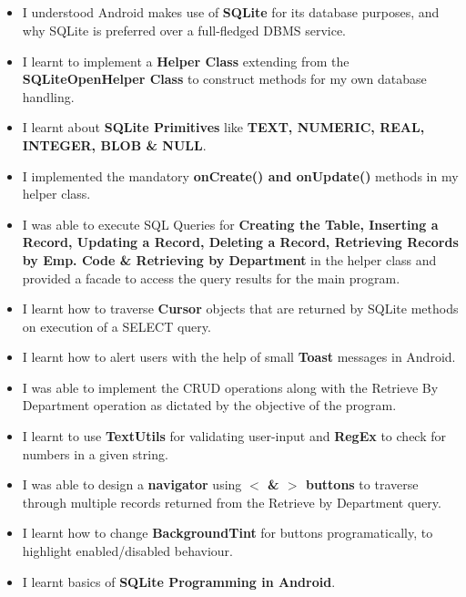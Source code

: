 \documentclass[12pt, a4]{article}
\begin{document}
\subsection*{}
\begin{itemize}
\item I understood Android makes use of \textbf{SQLite} for its database purposes, and why SQLite is preferred over a full-fledged DBMS service.
\item I learnt to implement a \textbf{Helper Class} extending from the \textbf{SQLiteOpenHelper Class} to construct methods for my own database handling.
\item I learnt about \textbf{SQLite Primitives} like \textbf{TEXT, NUMERIC, REAL, INTEGER, BLOB \& NULL}.
\item I implemented the mandatory \textbf{onCreate() and onUpdate()} methods in my helper class.
\item I was able to execute SQL Queries for \textbf{Creating the Table, Inserting a Record, Updating a Record, Deleting a Record, Retrieving Records by Emp. Code \& Retrieving by Department} in the helper class and provided a facade to access the query results for the main program.
\item I learnt how to traverse \textbf{Cursor} objects that are returned by SQLite methods on execution of a SELECT query.
\item I learnt how to alert users with the help of small \textbf{Toast} messages in Android.
\item I was able to implement the CRUD operations along with the Retrieve By Department operation as dictated by the objective of the program.
\item I learnt to use \textbf{TextUtils} for validating user-input and \textbf{RegEx} to check for numbers in a given string.
\item I was able to design a \textbf{navigator} using \textbf{$<$ \& $>$ buttons} to traverse through multiple records returned from the Retrieve by Department query.
\item I learnt how to change \textbf{BackgroundTint} for buttons programatically, to highlight enabled/disabled behaviour.
\item I learnt basics of \textbf{SQLite Programming in Android}.

\end{itemize}
\end{document}
